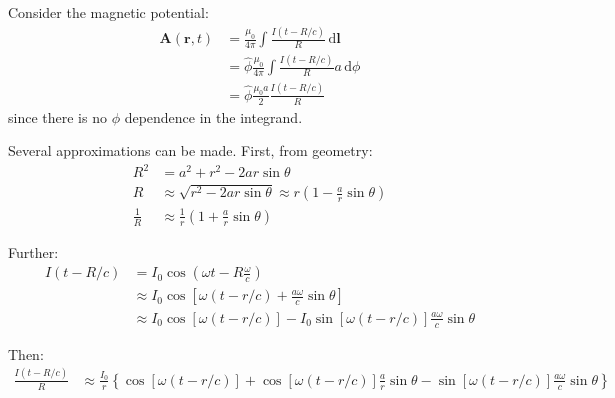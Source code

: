 \documentclass[12pt]{article}
\begin{document}



\pagebreak
\section*{}



Consider the magnetic potential:
\begin{equation}
    \begin{split}
        \mathbf{A}(\mathbf{r}, t) &= \frac{\mu_{0}}{4\pi} \int \frac{I(t - R/c)}{R} \, \mathrm{d}\mathbf{l} \\
        &= \hat{\phi} \frac{\mu_{0}}{4\pi} \int \frac{I(t - R/c)}{R} a \, \mathrm{d}\phi \\
        &= \hat{\phi} \frac{\mu_{0} a}{2} \frac{I(t - R/c)}{R}
    \end{split}
\end{equation}
since there is no $\phi$ dependence in the integrand.

Several approximations can be made. First, from geometry:
\begin{equation}
    \begin{split}
        R^{2} &= a^{2} + r^{2} - 2ar \sin{\theta} \\
        R &\approx \sqrt{r^{2} - 2ar \sin{\theta}} \approx r \left( 1 - \frac{a}{r} \sin{\theta} \right) \\
        \frac{1}{R} &\approx \frac{1}{r} \left( 1 + \frac{a}{r} \sin{\theta} \right)
    \end{split}
\end{equation}

Further:
\begin{equation}
    \begin{split}
        I(t - R/c) &= I_{0} \cos{\left( \omega t - R \frac{\omega}{c} \right)} \\
        &\approx I_{0} \cos{\left[ \omega (t - r/c) + \frac{a\omega}{c} \sin{\theta} \right]} \\
        &\approx I_{0} \cos{\left[ \omega (t - r/c) \right]} - I_{0} \sin{\left[ \omega (t - r/c) \right]} \frac{a \omega}{c} \sin{\theta}
    \end{split}
\end{equation}

Then:
\begin{equation}
    \begin{split}
        \frac{I(t - R/c)}{R} &\approx \frac{I_{0}}{r} \left\{ \cos{\left[ \omega (t - r/c) \right]} + \cos{\left[ \omega (t - r/c) \right]} \frac{a}{r} \sin{\theta} - \sin{\left[ \omega (t - r/c) \right]} \frac{a \omega}{c} \sin{\theta} \right\} \\
    \end{split}
\end{equation}
\end{document}
